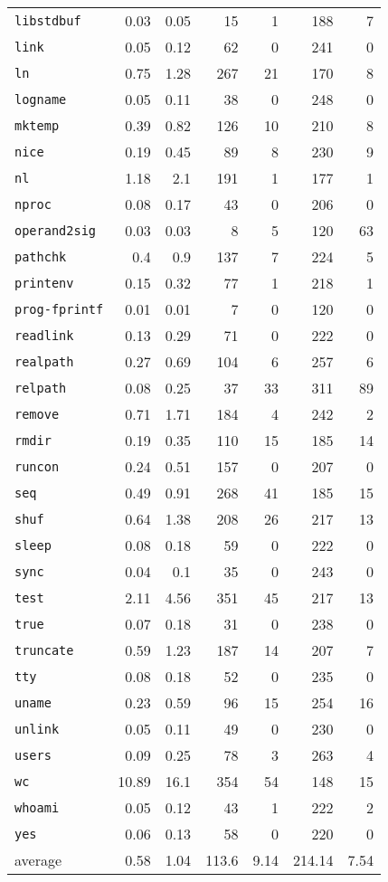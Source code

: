 \documentclass[12pt,oneside]{fithesis2}
\theoremstyle{definition}
\begin{document}
\begin{table}[ht!]
\begin{tabular}{l rrrr | rr}
    \texttt{libstdbuf} & 0.03 & 0.05 & 15 & 1 & 188 & 7 \\
    \texttt{link} & 0.05 & 0.12 & 62 & 0 & 241 & 0 \\
    \texttt{ln} & 0.75 & 1.28 & 267 & 21 & 170 & 8 \\
    \texttt{logname} & 0.05 & 0.11 & 38 & 0 & 248 & 0 \\
    \texttt{mktemp} & 0.39 & 0.82 & 126 & 10 & 210 & 8 \\
    \texttt{nice} & 0.19 & 0.45 & 89 & 8 & 230 & 9 \\
    \texttt{nl} & 1.18 & 2.1 & 191 & 1 & 177 & 1 \\
    \texttt{nproc} & 0.08 & 0.17 & 43 & 0 & 206 & 0 \\
    \texttt{operand2sig} & 0.03 & 0.03 & 8 & 5 & 120 & 63 \\
    \texttt{pathchk} & 0.4 & 0.9 & 137 & 7 & 224 & 5 \\
    \texttt{printenv} & 0.15 & 0.32 & 77 & 1 & 218 & 1 \\
    \texttt{prog-fprintf} & 0.01 & 0.01 & 7 & 0 & 120 & 0 \\
    \texttt{readlink} & 0.13 & 0.29 & 71 & 0 & 222 & 0 \\
    \texttt{realpath} & 0.27 & 0.69 & 104 & 6 & 257 & 6 \\
    \texttt{relpath} & 0.08 & 0.25 & 37 & 33 & 311 & 89 \\
    \texttt{remove} & 0.71 & 1.71 & 184 & 4 & 242 & 2 \\
    \texttt{rmdir} & 0.19 & 0.35 & 110 & 15 & 185 & 14 \\
    \texttt{runcon} & 0.24 & 0.51 & 157 & 0 & 207 & 0 \\
    \texttt{seq} & 0.49 & 0.91 & 268 & 41 & 185 & 15 \\
    \texttt{shuf} & 0.64 & 1.38 & 208 & 26 & 217 & 13 \\
    \texttt{sleep} & 0.08 & 0.18 & 59 & 0 & 222 & 0 \\
    \texttt{sync} & 0.04 & 0.1 & 35 & 0 & 243 & 0 \\
    \texttt{test} & 2.11 & 4.56 & 351 & 45 & 217 & 13 \\
    \texttt{true} & 0.07 & 0.18 & 31 & 0 & 238 & 0 \\
    \texttt{truncate} & 0.59 & 1.23 & 187 & 14 & 207 & 7 \\
    \texttt{tty} & 0.08 & 0.18 & 52 & 0 & 235 & 0 \\
    \texttt{uname} & 0.23 & 0.59 & 96 & 15 & 254 & 16 \\
    \texttt{unlink} & 0.05 & 0.11 & 49 & 0 & 230 & 0 \\
    \texttt{users} & 0.09 & 0.25 & 78 & 3 & 263 & 4 \\
    \texttt{wc} & 10.89 & 16.1 & 354 & 54 & 148 & 15 \\
    \texttt{whoami} & 0.05 & 0.12 & 43 & 1 & 222 & 2 \\
    \texttt{yes} & 0.06 & 0.13 & 58 & 0 & 220 & 0 \\
    \midrule
    average & 0.58 & 1.04 & 113.6 & 9.14 & 214.14 & 7.54 \\


\end{tabular}
\end{table}
\end{document}
